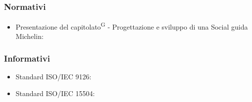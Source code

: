 \subsubsection{Normativi}
\begin{itemize}
\item Presentazione del capitolato\textsuperscript{G} - \zd Progettazione e sviluppo di una Social guida Michelin: \newline{}
\end{itemize}

\subsubsection{Informativi}
\begin{itemize}
\item Standard ISO/IEC 9126: \newline{}
\item Standard ISO/IEC 15504: \newline{}

\end{itemize}
